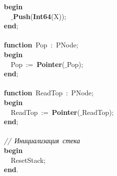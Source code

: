 \mbox{}\textbf{begin} \\
\mbox{}\ \ \textbf{$\_$Push}(\textbf{Int64}(X)); \\
\mbox{}\textbf{end}; \\
\mbox{} \\
\mbox{}\textbf{function}\ Pop\ :\ PNode; \\
\mbox{}\textbf{begin} \\
\mbox{}\ \ Pop\ :=\ \textbf{Pointer}($\_$Pop); \\
\mbox{}\textbf{end}; \\
\mbox{} \\
\mbox{}\textbf{function}\ ReadTop\ :\ PNode; \\
\mbox{}\textbf{begin} \\
\mbox{}\ \ ReadTop\ :=\ \textbf{Pointer}($\_$ReadTop); \\
\mbox{}\textbf{end}; \\
\mbox{} \\
\mbox{}\textit{//\ Инициализация\ стека} \\
\mbox{}\textbf{begin} \\
\mbox{}\ \ ResetStack; \\
\mbox{}\textbf{end}. \\
\mbox{} \\
\mbox{}
